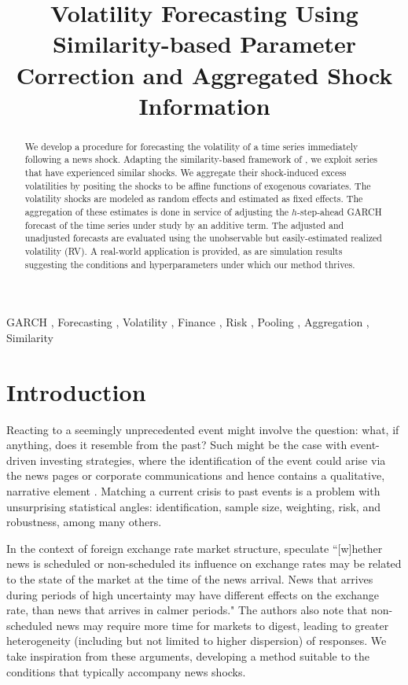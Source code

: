 \documentclass[11pt,3p,review,authoryear]{elsarticle}
\theoremstyle{definition}
\begin{document}
\begin{frontmatter}

\title{Volatility Forecasting Using Similarity-based Parameter Correction and Aggregated Shock Information}

\begin{abstract}
  We develop a procedure for forecasting the volatility of a time series immediately following a news shock.  Adapting the similarity-based framework of \citet{lin2021minimizing}, we exploit series that have experienced similar shocks.  We aggregate their shock-induced excess volatilities by positing the shocks to be affine functions of exogenous covariates.  The volatility shocks are modeled as random effects and estimated as fixed effects.  The aggregation of these estimates is done in service of adjusting the $h$-step-ahead GARCH forecast of the time series under study by an additive term.  The adjusted and unadjusted forecasts are evaluated using the unobservable but easily-estimated realized volatility (RV).  A real-world application is provided, as are simulation results suggesting the conditions and hyperparameters under which our method thrives.
\end{abstract}

\begin{keyword}
  GARCH \sep 
 Forecasting \sep 
 Volatility \sep 
Finance \sep
Risk \sep
Pooling \sep
Aggregation \sep
Similarity
\end{keyword}

\end{frontmatter}

\section{Introduction}

Reacting to a seemingly unprecedented event might involve the question: what, if anything, does it resemble from the past?  Such might be the case with event-driven investing strategies, where the identification of the event could arise via the news pages or corporate communications and hence contains a qualitative, narrative element \citep{Kenton}.  Matching a current crisis to past events is a problem with unsurprising statistical angles: identification, sample size, weighting, risk, and robustness, among many others.  

In the context of foreign exchange rate market structure, \citet{dominguez2006defines} speculate ``[w]hether news is scheduled or non-scheduled its influence on exchange rates may be related
to the state of the market at the time of the news arrival.  News that arrives during periods of
high uncertainty may have different effects on the exchange rate, than news that arrives in
calmer periods." The authors also note that non-scheduled news may require more time for markets to digest, leading to greater heterogeneity (including but not limited to higher dispersion) of responses.  We take inspiration from these arguments, developing a method suitable to the conditions that typically accompany news shocks. 
\end{document}
